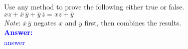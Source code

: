 \item{}
Use any method to prove the following either true or false.\\[6pt]
$xz+\overline{x}\,\overline{y}+\overline{y}\,\overline{z}=xz+\overline{y}$\\[6pt]
\emph{Note}\/: $\overline{x}\,\overline{y}$ negates $x$ and $y$ first, then
combines the results.\\[12pt]
\ifanswers
\textcolor{blue}{
\textbf{Answer:}\\
answer
}
\newpage
\fi

